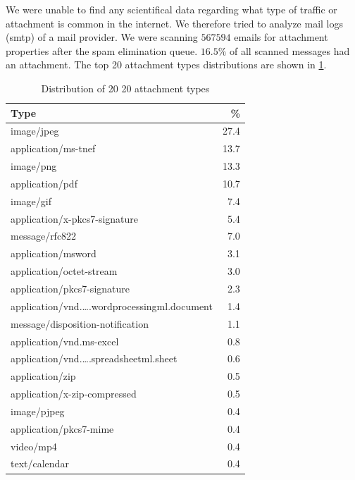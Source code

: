 We were unable to find any scientifical data regarding what type of traffic or attachment is common in the internet. We therefore tried to analyze mail logs (smtp) of a mail provider. We were scanning $567594$ emails for attachment properties after the spam elimination queue. $16.5\%$ of all scanned messages had an attachment. The top 20 attachment types distributions are shown in \ref{tab:emailAttachments}.
\begin{table}[H]

\begin{tabular}{l|r}\hline
	Type																		& \%\\\hline
	image/jpeg                                                                  &	27.4\\
	application/ms-tnef	                                                        &	13.7\\
	image/png                                                                   &	13.3\\
	application/pdf                                                             &	10.7\\
	image/gif                                                                   &	7.4\\
	application/x-pkcs7-signature                                               &	5.4\\
	message/rfc822                                                              &	7.0\\
	application/msword                                                          &	3.1\\
	application/octet-stream                                                    &	3.0\\
	application/pkcs7-signature                                                 &	2.3\\
	application/vnd.\ldots.wordprocessingml.document	                        & 	1.4\\
	message/disposition-notification                                            &	1.1\\
	application/vnd.ms-excel                                                    &	0.8\\
	application/vnd.\ldots.spreadsheetml.sheet                                  &	0.6\\
	application/zip                                                             &	0.5\\
	application/x-zip-compressed                                                &	0.5\\
	image/pjpeg                                                                 &	0.4\\
	application/pkcs7-mime                                                      &	0.4\\
	video/mp4                                                                   &	0.4\\
	text/calendar                                                               &	0.4\\\hline
\end{tabular}
	\caption{Distribution of 20 20 attachment types}
\label{tab:emailAttachments}
\end{table}
